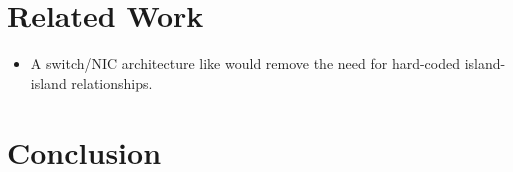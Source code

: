 \documentclass[sigconf,natbib=false]{acmart}
\begin{document}
\section{Related Work}

\begin{itemize}
	\item A switch/NIC architecture like \textcite{DBLP:conf/hotnets/StephensAS18} would remove the need for hard-coded island-island relationships.
\end{itemize}

\section{Conclusion}
	
%
%
\printbibliography
	
\end{document}
